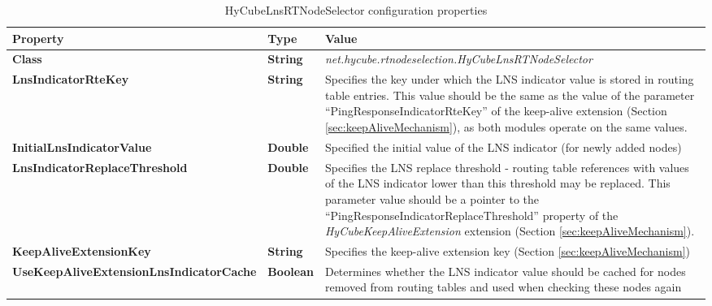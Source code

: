 \begin{table}
\scriptsize
\begin{center}
\begin{tabular}{p{5.3cm} p{1.2cm} p{8.0cm}}
	\hline
	\textbf{Property}									& \textbf{Type}					& \textbf{Value}					\\[1mm]
    \hline
	\textbf{Class}										& \textbf{String}				& \textit{net.hycube.rtnodeselection.HyCubeLnsRTNodeSelector}				\\[1.5mm]
    \textbf{LnsIndicatorRteKey}							& \textbf{String}				& Specifies the key under which the LNS indicator value is stored in routing table entries. This value should be the same as the value of the parameter ``PingResponseIndicatorRteKey'' of the keep-alive extension (Section \ref{sec:keepAliveMechanism}), as both modules operate on the same values.					\\[1.5mm]
	\textbf{InitialLnsIndicatorValue}					& \textbf{Double}				& Specified the initial value of the LNS indicator (for newly added nodes)									\\[1.5mm]
	\textbf{LnsIndicatorReplaceThreshold}				& \textbf{Double}				& Specifies the LNS replace threshold - routing table references with values of the LNS indicator lower than this threshold may be replaced. This parameter value should be a pointer to the ``PingResponseIndicatorReplaceThreshold'' property of the \emph{HyCubeKeepAliveExtension} extension (Section \ref{sec:keepAliveMechanism}).				\\[1.5mm]
	\textbf{KeepAliveExtensionKey}						& \textbf{String}				& Specifies the keep-alive extension key (Section \ref{sec:keepAliveMechanism})									\\[1.5mm]
	\textbf{UseKeepAliveExtensionLnsIndicatorCache}		& \textbf{Boolean}				& Determines whether the LNS indicator value should be cached for nodes removed from routing tables	and used when checking these nodes again				\\[1.5mm]
    \hline
\end{tabular}
\end{center}
\caption{HyCubeLnsRTNodeSelector configuration properties}
\label{tab:libHyCubeLnsRTNodeSelector}
\end{table}

